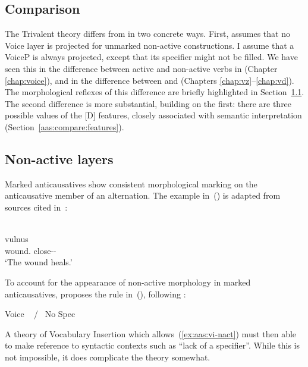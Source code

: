 \begin{exe}
\begin{xlist}
\begin{exe}
\begin{exe}
\begin{xlist}
\begin{exe}
\section{Comparison} \label{aas:compare}
The Trivalent theory differs from  in two concrete ways. First,  assumes that no Voice layer is projected for unmarked non-active constructions. I assume that a VoiceP is always projected, except that its specifier might not be filled. We have seen this in the difference between active and non-active verbs in {\tkal} (Chapter \ref{chap:voice}), and in the difference between {\vz} and {\vd} (Chapters \ref{chap:vz}--\ref{chap:vd}). The morphological reflexes of this difference are briefly highlighted in Section~\ref{aas:compare:vi-nact}. The second difference  is more substantial, building on the first: there are three possible values of the [D] features, closely associated with semantic interpretation (Section~\ref{aas:compare:features}).

	\subsection{Non-active layers} \label{aas:compare:vi-nact}
Marked anticausatives show consistent morphological marking on the anticausative member of an alternation. The  example in~(\nextx) is adapted from sources cited in~\cite{kastnerzu17}:
 \begin{exe}
\ex   {}\\
  \gll vulnus \\
 	  wound. close--\\
 	\glt `The wound heals.' 
	
 \z 

To account for the appearance of non-active morphology in marked anticausatives,  proposes the rule in~(\nextx), following \cite{embick04}:
 \begin{exe}
\ex \label{ex:aas:vi-nact}Voice \lra~ / \trace~No Spec 
 \z 

A theory of Vocabulary Insertion which allows~(\ref{ex:aas:vi-nact}) must then able to make reference to syntactic contexts such as ``lack of a specifier''. While this is not impossible, it does complicate the theory somewhat.\label{r1:6:1}


\end{exe}
\end{exe}
\end{exe}
\end{xlist}
\end{exe}
\end{exe}
\end{xlist}
\end{exe}
